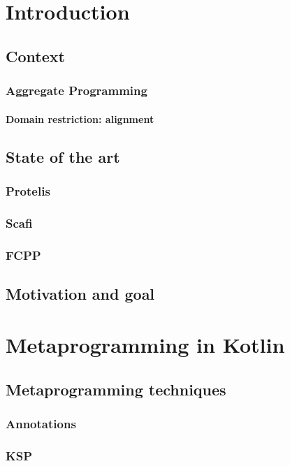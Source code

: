 \chapter{Introduction}\label{introduction}

\section{Context}
\subsection{Aggregate Programming}
\subsubsection{Domain restriction: alignment}

\section{State of the art}
\subsection{Protelis}
\subsection{Scafi}
\subsection{FCPP}

\section{Motivation and goal}

\chapter{Metaprogramming in Kotlin}

\section{Metaprogramming techniques}
\subsection{Annotations}
\subsection{KSP}
